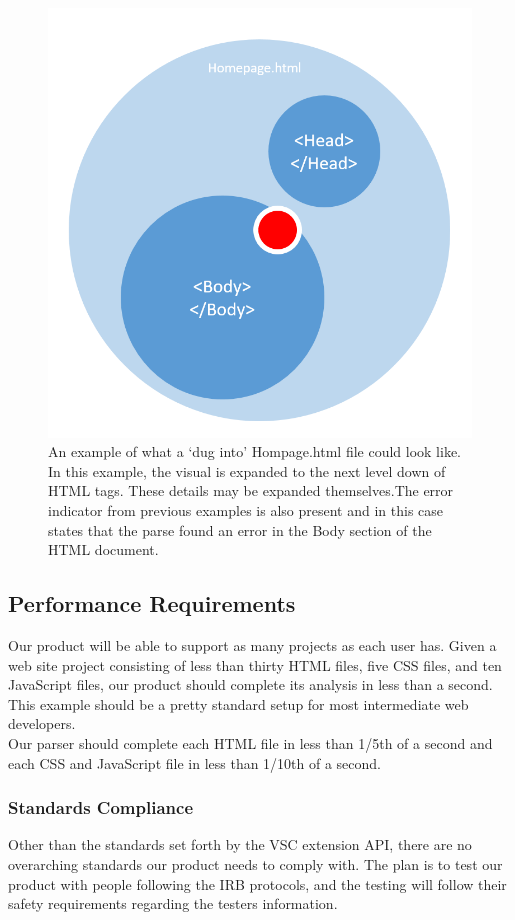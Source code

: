 \documentclass[letterpaper,10pt,titlepage,draftclsnofoot,onecolumn,onesided] {IEEEtran}
\begin{document}
\begin{figure}
\includegraphics[scale=0.25]{digdown.png}
\caption{An example of what a `dug into' Hompage.html file could look like.
In this example, the visual is expanded to the next level down of HTML tags.
These details may be expanded themselves.The error indicator from previous examples is also present and in this case states that the parse found an error in the Body section of the HTML document.}
\end{figure}

\subsection{Performance Requirements}
Our product will be able to support as many projects as each user has. 
Given a web site project consisting of less than thirty HTML files, five CSS files, and ten JavaScript files, our product should complete its analysis in less than a second. 
This example should be a pretty standard setup for most intermediate web developers.
\\
Our parser should complete each HTML file in less than 1/5th of a second and each CSS and JavaScript file in less than 1/10th of a second.

\subsubsection{Standards Compliance}
Other than the standards set forth by the VSC extension API, there are no overarching standards our product needs to comply with.
The plan is to test our product with people following the IRB protocols, and the testing will follow their safety requirements regarding the testers information.
\end{document}
